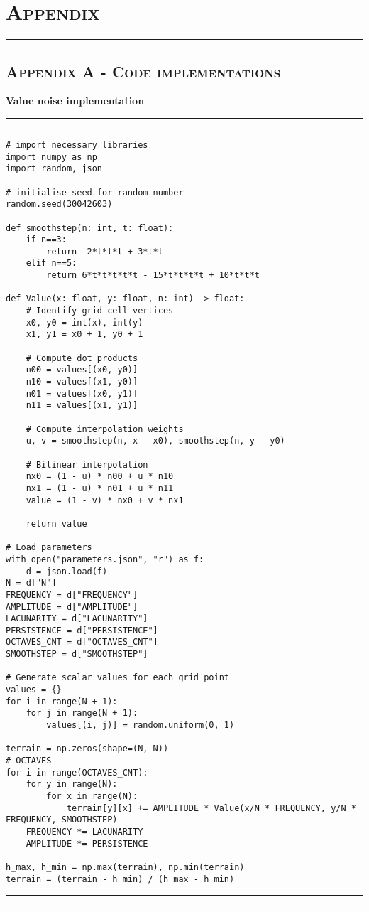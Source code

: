 \section{\textsc{Appendix}}
\hrule height 0.5pt
\vspace*{2.5pt}

\subsection*{\centering\textsc{Appendix A - Code implementations}}

\textbf{\large{Value noise implementation}}
\vspace{2.5pt}
\hrule
\vspace{1mm}
\hrule
\begin{lstlisting}
# import necessary libraries
import numpy as np
import random, json

# initialise seed for random number
random.seed(30042603)
    
def smoothstep(n: int, t: float):
    if n==3:
        return -2*t*t*t + 3*t*t
    elif n==5:
        return 6*t*t*t*t*t - 15*t*t*t*t + 10*t*t*t

def Value(x: float, y: float, n: int) -> float:
    # Identify grid cell vertices
    x0, y0 = int(x), int(y)
    x1, y1 = x0 + 1, y0 + 1
            
    # Compute dot products
    n00 = values[(x0, y0)]
    n10 = values[(x1, y0)]
    n01 = values[(x0, y1)]
    n11 = values[(x1, y1)]

    # Compute interpolation weights
    u, v = smoothstep(n, x - x0), smoothstep(n, y - y0)

    # Bilinear interpolation
    nx0 = (1 - u) * n00 + u * n10
    nx1 = (1 - u) * n01 + u * n11
    value = (1 - v) * nx0 + v * nx1

    return value

# Load parameters
with open("parameters.json", "r") as f:
    d = json.load(f)
N = d["N"]
FREQUENCY = d["FREQUENCY"]
AMPLITUDE = d["AMPLITUDE"]
LACUNARITY = d["LACUNARITY"]
PERSISTENCE = d["PERSISTENCE"]
OCTAVES_CNT = d["OCTAVES_CNT"]
SMOOTHSTEP = d["SMOOTHSTEP"]

# Generate scalar values for each grid point
values = {}
for i in range(N + 1):
    for j in range(N + 1):
        values[(i, j)] = random.uniform(0, 1)

terrain = np.zeros(shape=(N, N))
# OCTAVES
for i in range(OCTAVES_CNT):  
    for y in range(N):
        for x in range(N):
            terrain[y][x] += AMPLITUDE * Value(x/N * FREQUENCY, y/N * FREQUENCY, SMOOTHSTEP)  
    FREQUENCY *= LACUNARITY
    AMPLITUDE *= PERSISTENCE
    
h_max, h_min = np.max(terrain), np.min(terrain)
terrain = (terrain - h_min) / (h_max - h_min)
\end{lstlisting}
\hrule
\vspace{1mm}
\hrule

